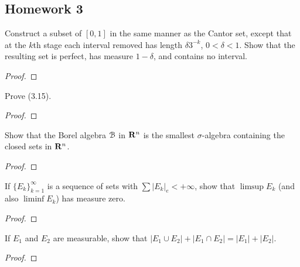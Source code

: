 \subsection{Homework 3}
\begin{problem}
Construct a subset of $[0,1]$ in the same manner as the Cantor set, except
that at the $k$th stage each interval removed has length $\delta 3^{-k}$,
$0<\delta<1$. Show that the resulting set is perfect, has measure
$1-\delta$, and contains no interval.
\end{problem}
\begin{proof}
\end{proof}

\begin{problem}
Prove (3.15).
\end{problem}
\begin{proof}
\end{proof}

\begin{problem}
Show that the Borel algebra $\mathcal{B}$ in $\mathbf{R}^n$ is the smallest
$\sigma$-algebra containing the closed sets in $\mathbf{R}^n$.
\end{problem}
\begin{proof}
\end{proof}

\begin{problem}
  If ${\{E_k\}}_{k=1}^\infty$ is a sequence of sets with
  $\sum|{E_k}|_e<+\infty$, show that $\limsup E_k$ (and also
  $\liminf E_k$) has measure zero.
\end{problem}
\begin{proof}
\end{proof}

\begin{problem}
If $E_1$ and $E_2$ are measurable, show that
$|E_1\cup E_2|+|E_1\cap E_2|=|E_1|+|E_2|$.
\end{problem}
\begin{proof}
\end{proof}

